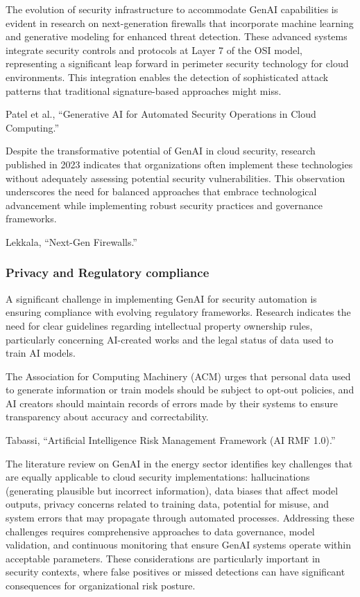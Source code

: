 The evolution of security infrastructure to accommodate GenAI capabilities is evident in research on next-generation firewalls that incorporate machine learning and generative modeling for enhanced threat detection. These advanced systems integrate security controls and protocols at Layer 7 of the OSI model, representing a significant leap forward in perimeter security technology for cloud environments. This integration enables the detection of sophisticated attack patterns that traditional signature-based approaches might miss.

Patel et al., “Generative AI for Automated Security Operations in Cloud Computing.”

Despite the transformative potential of GenAI in cloud security, research published in 2023 indicates that organizations often implement these technologies without adequately assessing potential security vulnerabilities. This observation underscores the need for balanced approaches that embrace technological advancement while implementing robust security practices and governance frameworks.

Lekkala, “Next-Gen Firewalls.”


\subsubsection{Privacy and Regulatory compliance} %
\label{sec:Privacy and Regulatory compliance}

A significant challenge in implementing GenAI for security automation is ensuring compliance with evolving regulatory frameworks. Research indicates the need for clear guidelines regarding intellectual property ownership rules, particularly concerning AI-created works and the legal status of data used to train AI models.

The Association for Computing Machinery (ACM) urges that personal data used to generate information or train models should be subject to opt-out policies, and AI creators should maintain records of errors made by their systems to ensure transparency about accuracy and correctability.

Tabassi, “Artificial Intelligence Risk Management Framework (AI RMF 1.0).”

The literature review on GenAI in the energy sector identifies key challenges that are equally applicable to cloud security implementations: hallucinations (generating plausible but incorrect information), data biases that affect model outputs, privacy concerns related to training data, potential for misuse, and system errors that may propagate through automated processes.
Addressing these challenges requires comprehensive approaches to data governance, model validation, and continuous monitoring that ensure GenAI systems operate within acceptable parameters. These considerations are particularly important in security contexts, where false positives or missed detections can have significant consequences for organizational risk posture.

